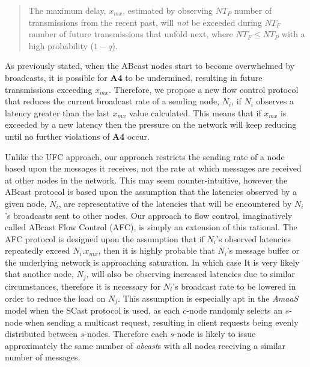     \begin{quotation}
            The maximum delay, $x_{mx}$, estimated by observing $NT_P$ number of transmissions from the recent past, will \emph{not} be exceeded during $NT_F$ number of future transmissions that unfold next, where $NT_F \leq NT_P$ with a high probability ($1 - q$).
        \end{quotation}
    
    As previously stated, when the \textsf{ABcast} nodes start to become overwhelmed by broadcasts, it is possible for \textbf{A4} to be undermined, resulting in future transmissions exceeding $x_{mx}$.  Therefore, we propose a new flow control protocol that reduces the current broadcast rate of a sending node, $N_i$, if $N_i$ observes a latency greater than the last $x_{mx}$ value calculated.  This means that if $x_{mx}$ is exceeded by a new latency then the pressure on the network will keep reducing until no further violations of \textbf{A4} occur.  
    
    Unlike the \textsf{UFC} approach, our approach restricts the sending rate of a node based upon the messages it receives, not the rate at which messages are received at other nodes in the network.  This may seem counter-intuitive, however the \textsf{ABcast} protocol is based upon the assumption that the latencies observed by a given node, $N_i$, are representative of the latencies that will be encountered by $N_i$'s broadcasts sent to other nodes.  Our approach to flow control, imaginatively called ABcast Flow Control (AFC), is simply an extension of this rational.  The AFC protocol is designed upon the assumption that if $N_i$'s observed latencies repeatedly exceed $N_i.x_{mx}$, then it is highly probable that $N_i$'s message buffer or the underlying network is approaching saturation.  In which case It is very likely that another node, $N_j$, will also be observing increased latencies due to similar circumstances, therefore it is necessary for $N_i$'s broadcast rate to be lowered in order to reduce the load on $N_j$.  This assumption is especially apt in the \emph{AmaaS} model when the \textsf{SCast} protocol is used, as each $c$-node randomly selects an $s$-node when sending a multicast request, resulting in client requests being evenly distributed between $s$-nodes.  Therefore each $s$-node is likely to issue approximately the same number of \emph{abcast}s with all nodes receiving a similar number of messages.          
        
